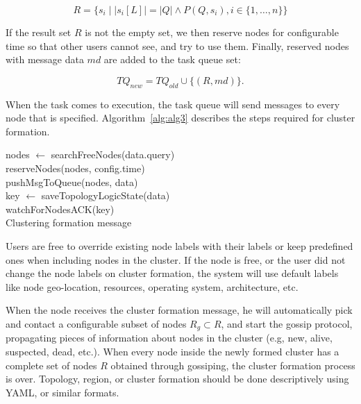 \begin{equation}\label{frm:query_rule}  
	R=\{ s_i \;|\; \left|s_i[L]\right|=\left|Q\right| \wedge P(Q, s_i),i\in\{1, \ldots, n\}\}
\end{equation} 

\noindent
If the result set $R$ is not the empty set, we then reserve nodes for configurable time so that other users cannot see, and try to use them.  Finally, reserved nodes with message data $\mathit{md}$ are added to the task queue set:

\begin{equation}
	TQ_\mathit{new} =TQ_\mathit{old}\cup \{(R, md)\}.
\end{equation}

\noindent 
When the task comes to execution, the task queue will send messages to every node that is specified. Algorithm~\ref{alg:alg3} describes the steps required for cluster formation.

\begin{algorithm}[H]
	\SetAlgoLined
	nodes $\leftarrow$ searchFreeNodes(data.query)\\
	reserveNodes(nodes, config.time)\\
	pushMsgToQueue(nodes, data)\\
	key $\leftarrow$ saveTopologyLogicState(data)\\
	watchForNodesACK(key)\\
	\caption{Clustering formation message}
	\label{alg:alg3}
\end{algorithm}

\noindent
Users are free to override existing node labels with their labels or keep predefined ones when including nodes in the cluster. If the node is free, or the user did not change the node labels on cluster formation, the system will use default labels like node geo-location, resources, operating system, architecture, etc.   

When the node receives the cluster formation message, he will automatically pick and contact a configurable subset of nodes $R_g \subset R$, and start the gossip protocol, propagating pieces of information about nodes in the cluster (e.g, new, alive, suspected, dead, etc.). When every node inside the newly formed cluster has a complete set of nodes $R$ obtained through gossiping, the cluster formation process is over. Topology, region, or cluster formation should be done descriptively using YAML, or similar formats. 

